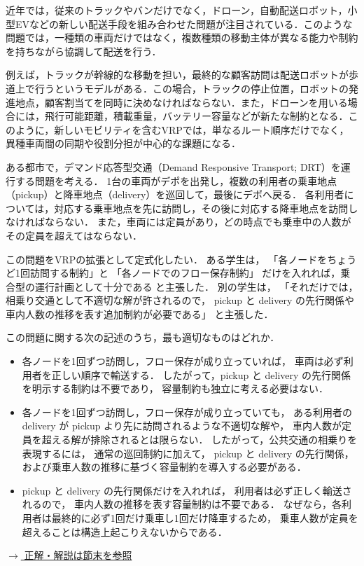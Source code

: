 近年では，従来のトラックやバンだけでなく，ドローン，自動配送ロボット，小型EVなどの新しい配送手段を組み合わせた問題が注目されている．このような問題では，一種類の車両だけではなく，複数種類の移動主体が異なる能力や制約を持ちながら協調して配送を行う．

例えば，トラックが幹線的な移動を担い，最終的な顧客訪問は配送ロボットが歩道上で行うというモデルがある．この場合，トラックの停止位置，ロボットの発進地点，顧客割当てを同時に決めなければならない\cite{HEIMFARTH2022401}．また，ドローンを用いる場合には，飛行可能距離，積載重量，バッテリー容量などが新たな制約となる\cite{MURRAY201586}．このように，新しいモビリティを含むVRPでは，単なるルート順序だけでなく，異種車両間の同期や役割分担が中心的な課題になる．

\begin{example}[title={クイズ4：公共交通の相乗り}]
ある都市で，デマンド応答型交通（Demand Responsive Transport; DRT）を運行する問題を考える．
1台の車両がデポを出発し，複数の利用者の乗車地点（pickup）と降車地点（delivery）を巡回して，最後にデポへ戻る．
各利用者については，対応する乗車地点を先に訪問し，その後に対応する降車地点を訪問しなければならない．
また，車両には定員があり，どの時点でも乗車中の人数がその定員を超えてはならない．

この問題をVRPの拡張として定式化したい．
ある学生は，
「各ノードをちょうど1回訪問する制約」と
「各ノードでのフロー保存制約」
だけを入れれば，乗合型の運行計画として十分である
と主張した．
別の学生は，
「それだけでは，相乗り交通として不適切な解が許されるので，
pickup と delivery の先行関係や車内人数の推移を表す追加制約が必要である」
と主張した．

この問題に関する次の記述のうち，最も適切なものはどれか．

\begin{itemize}
\item[(ア)]
各ノードを1回ずつ訪問し，フロー保存が成り立っていれば，
車両は必ず利用者を正しい順序で輸送する．
したがって，pickup と delivery の先行関係を明示する制約は不要であり，
容量制約も独立に考える必要はない．

\item[(イ)]
各ノードを1回ずつ訪問し，フロー保存が成り立っていても，
ある利用者の delivery が pickup より先に訪問されるような不適切な解や，
車内人数が定員を超える解が排除されるとは限らない．
したがって，公共交通の相乗りを表現するには，
通常の巡回制約に加えて，
pickup と delivery の先行関係，
および乗車人数の推移に基づく容量制約を導入する必要がある．

\item[(ウ)]
pickup と delivery の先行関係だけを入れれば，
利用者は必ず正しく輸送されるので，
車内人数の推移を表す容量制約は不要である．
なぜなら，各利用者は最終的に必ず1回だけ乗車し1回だけ降車するため，
乗車人数が定員を超えることは構造上起こりえないからである．
\end{itemize}

\hyperref[ans:rideshare2]{$\rightarrow$ 正解・解説は節末を参照}
\end{example}

